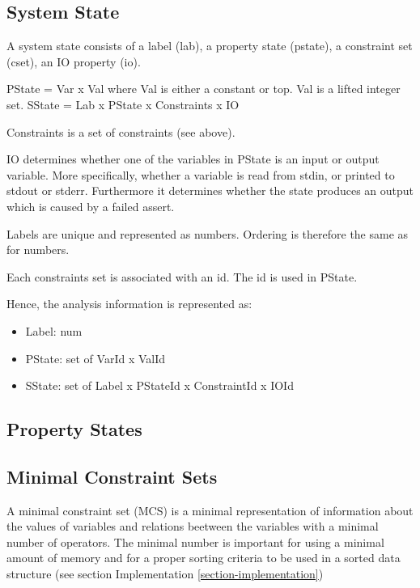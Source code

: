 \subsection{System State}

A system state consists of a label (lab), a property state (pstate), a constraint set (cset), an IO property (io).

PState = Var x Val where Val is either a constant or top. Val is a lifted integer set.
SState = Lab x PState x Constraints x IO

Constraints is a set of constraints (see above).

IO determines whether one of the variables in PState is an input or output variable. More specifically, whether a variable is read from stdin, or printed to stdout or stderr. Furthermore it determines whether the state produces an output which is caused by a failed assert.

Labels are unique and represented as numbers. Ordering is therefore the same as for numbers.

Each constraints set is associated with an id. The id is used in PState.

Hence, the analysis information is represented as:

\begin{itemize}
\item Label: num
\item PState: set of VarId x ValId
\item SState: set of Label x PStateId x ConstraintId x IOId
\end{itemize}

\subsection{Property States}


\subsection{Minimal Constraint Sets}
A minimal constraint set (MCS) is a minimal representation of
information about the values of variables and relations beetween the
variables with a minimal number of operators. The minimal number is
important for using a minimal amount of memory and for a proper
sorting criteria to be used in a sorted data structure (see section Implementation \ref{section-implementation})

